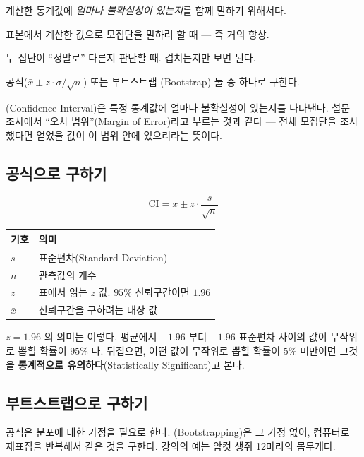 \begin{inbrief}
  \item[Why] 계산한 통계값에 \emph{얼마나 불확실성이 있는지}를 함께 말하기 위해서다.
  \item[When] 표본에서 계산한 값으로 모집단을 말하려 할 때 --- 즉 거의 항상.
  \item[Where] 두 집단이 ``정말로'' 다른지 판단할 때. 겹치는지만 보면 된다.
  \item[How] 공식($\bar{x} \pm z \cdot \sigma/\sqrt{n}$) 또는 부트스트랩
             (Bootstrap) 둘 중 하나로 구한다.
\end{inbrief}

(Confidence Interval)은 특정 통계값에 얼마나 불확실성이 있는지를
나타낸다. 설문 조사에서 ``오차 범위''(Margin of Error)라고 부르는 것과 같다 ---
전체 모집단을 조사했다면 얻었을 값이 이 범위 안에 있으리라는 뜻이다.

\subsection{공식으로 구하기}

\[
  \mathrm{CI} = \bar{x} \pm z \cdot \frac{s}{\sqrt{n}}
\]

\begin{center}
\begin{tabularx}{\linewidth}{@{}l X@{}}
\toprule
기호 & 의미 \\
\midrule
$s$ & 표준편차(Standard Deviation) \\
$n$ & 관측값의 개수 \\
$z$ & 표에서 읽는 $z$ 값. $95\%$ 신뢰구간이면 $1.96$ \\
$\bar{x}$ & 신뢰구간을 구하려는 대상 값 \\
\bottomrule
\end{tabularx}
\end{center}

$z = 1.96$ 의 의미는 이렇다. 평균에서 $-1.96$ 부터 $+1.96$ 표준편차 사이의 값이
무작위로 뽑힐 확률이 $95\%$ 다. 뒤집으면, 어떤 값이 무작위로 뽑힐 확률이 $5\%$
미만이면 그것을 \textbf{통계적으로 유의하다}(Statistically Significant)고 본다.

\subsection{부트스트랩으로 구하기}
\label{subsec:bootstrap}

공식은 분포에 대한 가정을 필요로 한다. (Bootstrapping)은 그
가정 없이, 컴퓨터로 재표집을 반복해서 같은 것을 구한다. 강의의 예는 암컷 생쥐
12마리의 몸무게다.


